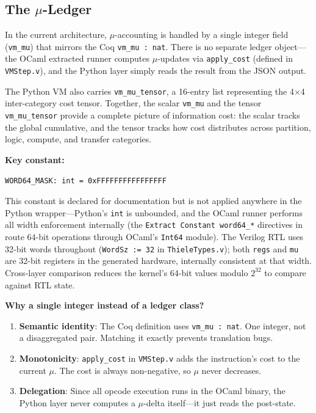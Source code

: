 \subsection{The $\mu$-Ledger}

In the current architecture, $\mu$-accounting is handled by a single integer field (\texttt{vm\_mu}) that mirrors the Coq \texttt{vm\_mu : nat}. There is no separate ledger object---the OCaml extracted runner computes $\mu$-updates via \texttt{apply\_cost} (defined in \texttt{VMStep.v}), and the Python layer simply reads the result from the JSON output.

The Python VM also carries \texttt{vm\_mu\_tensor}, a 16-entry list representing the 4$\times$4 inter-category cost tensor. Together, the scalar \texttt{vm\_mu} and the tensor \texttt{vm\_mu\_tensor} provide a complete picture of information cost: the scalar tracks the global cumulative, and the tensor tracks how cost distributes across partition, logic, compute, and transfer categories.

\textbf{Key constant:}
\begin{lstlisting}
WORD64_MASK: int = 0xFFFFFFFFFFFFFFFF
\end{lstlisting}

This constant is declared for documentation but is not applied anywhere in the Python wrapper---Python's \texttt{int} is unbounded, and the OCaml runner performs all width enforcement internally (the \texttt{Extract Constant word64\_*} directives in  route 64-bit operations through OCaml's \texttt{Int64} module). The Verilog RTL uses 32-bit words throughout (\texttt{WordSz := 32} in \texttt{ThieleTypes.v}); both \texttt{regs} and \texttt{mu} are 32-bit registers in the generated hardware, internally consistent at that width. Cross-layer comparison reduces the kernel's 64-bit values modulo $2^{32}$ to compare against RTL state.

\textbf{Why a single integer instead of a ledger class?}
\begin{enumerate}
    \item \textbf{Semantic identity}: The Coq definition uses \texttt{vm\_mu : nat}. One integer, not a disaggregated pair. Matching it exactly prevents translation bugs.
    \item \textbf{Monotonicity}: \texttt{apply\_cost} in \texttt{VMStep.v} adds the instruction's cost to the current $\mu$. The cost is always non-negative, so $\mu$ never decreases.
    \item \textbf{Delegation}: Since all opcode execution runs in the OCaml binary, the Python layer never computes a $\mu$-delta itself---it just reads the post-state.
\end{enumerate}

